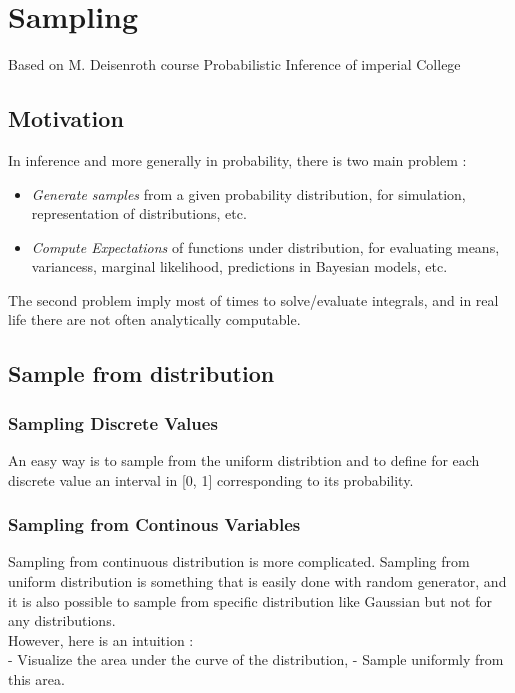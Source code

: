 \chapter{Sampling} %
\label{cha:sampling}

Based on M. Deisenroth course Probabilistic Inference of imperial College

	\section*{Motivation}

		In inference and more generally in probability, there is two main problem : 
		\begin{itemize}
			\item \emph{Generate samples} from a given probability distribution, for simulation, representation of distributions, etc.
			\item \emph{Compute Expectations} of functions under distribution, for evaluating means, variancess, marginal likelihood, predictions in Bayesian models, etc.
		\end{itemize}

		The second problem imply most of times to solve/evaluate integrals, and in real life there are not often analytically computable.

 	\section{Sample from distribution}

 		\subsection{Sampling Discrete Values}

 			An easy way is to sample from the uniform distribtion and to define for each discrete value an interval in [0, 1] corresponding to its probability.

 		\subsection{Sampling from Continous Variables}

 			Sampling from continuous distribution is more complicated. 
 			Sampling from uniform distribution is something that is easily done with random generator, and it is also possible to sample from specific distribution like Gaussian but not for any distributions.\\
 			However, here is an intuition : \\
 			- Visualize the area under the curve of the distribution,
 			- Sample uniformly from this area.

